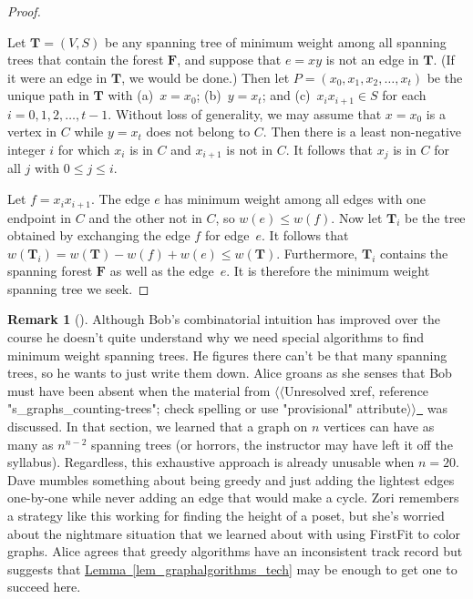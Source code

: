 \documentclass[10pt,]{book}
\theoremstyle{plain}
\theoremstyle{definition}
\theoremstyle{definition}
\newtheorem{remark}[theorem]{Remark}
\theoremstyle{definition}
\theoremstyle{definition}
\numberwithin{equation}{section}
\newcommand{\bfF}{\mathbf{F}}
\newcommand{\bfT}{\mathbf{T}}
\begin{document}
\begin{proof}\hypertarget{proof-7}{}
\hypertarget{p-165}{}%
Let \(\bfT=(V,S)\) be any spanning tree of minimum weight among all spanning trees that contain the forest \(\bfF\), and suppose that \(e=xy\) is not an edge in \(\bfT\). (If it were an edge in \(\bfT\), we would be done.) Then let \(P=(x_0,x_1,x_2,\dots,x_t)\) be the unique path in \(\bfT\) with (a)~\(x=x_0\); (b)~\(y=x_t\); and (c)~\(x_ix_{i+1}\in S\) for each \(i=0,1,2,\dots,t-1\). Without loss of generality, we may assume that \(x=x_0\) is a vertex in \(C\) while \(y=x_t\) does not belong to \(C\). Then there is a least non-negative integer \(i\) for which \(x_i\) is in \(C\) and \(x_{i+1}\) is not in \(C\). It follows that \(x_j\) is in \(C\) for all \(j\) with \(0\le j\le i\).%
\par
\hypertarget{p-166}{}%
Let \(f=x_ix_{i+1}\). The edge \(e\) has minimum weight among all edges with one endpoint in \(C\) and the other not in \(C\), so \(w(e)\le w(f)\). Now let \(\bfT_i\) be the tree obtained by exchanging the edge \(f\) for edge~\(e\). It follows that \(w(\bfT_i) = w(\bfT) - w(f) +w(e)\le w(\bfT)\). Furthermore, \(\bfT_i\) contains the spanning forest \(\bfF\) as well as the edge~\(e\). It is therefore the minimum weight spanning tree we seek.%
\end{proof}
\begin{remark}[]\label{remark-2}
\hypertarget{p-167}{}%
Although Bob's combinatorial intuition has improved over the course he doesn't quite understand why we need special algorithms to find minimum weight spanning trees. He figures there can't be that many spanning trees, so he wants to just write them down. Alice groans as she senses that Bob must have been absent when the material from {$\langle\langle$Unresolved xref, reference "s\_graphs\_counting-trees"; check spelling or use "provisional" attribute$\rangle\rangle$}\hyperlink{}{~} was discussed. In that section, we learned that a graph on \(n\) vertices can have as many as \(n^{n-2}\) spanning trees (or horrors, the instructor may have left it off the syllabus). Regardless, this exhaustive approach is already unusable when \(n = 20\). Dave mumbles something about being greedy and just adding the lightest edges one-by-one while never adding an edge that would make a cycle. Zori remembers a strategy like this working for finding the height of a poset, but she's worried about the nightmare situation that we learned about with using FirstFit to color graphs. Alice agrees that greedy algorithms have an inconsistent track record but suggests that \hyperref[lem_graphalgorithms_tech]{Lemma~\ref{lem_graphalgorithms_tech}} may be enough to get one to succeed here.%
\end{remark}
\typeout{************************************************}
\typeout{************************************************}
\end{document}
